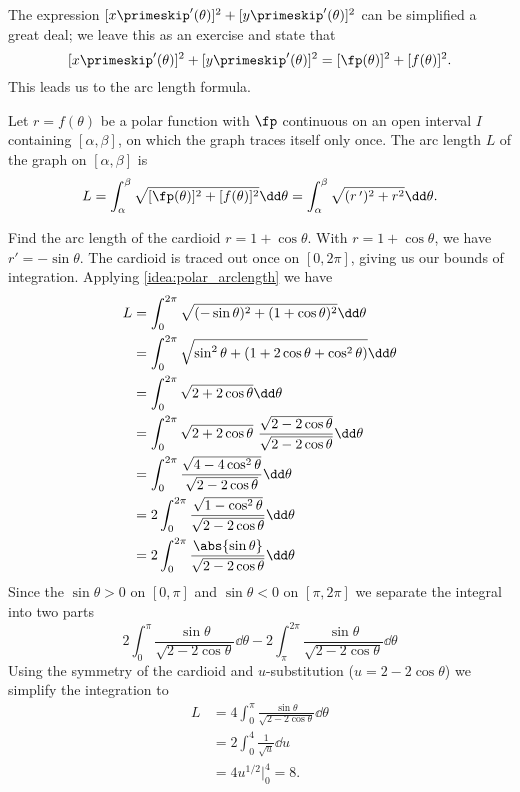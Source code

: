 The expression $[x\primeskip'(\theta)]^2+[y\primeskip'(\theta)]^2$ can be simplified a great deal; we leave this as an exercise and state that
\[
[x\primeskip'(\theta)]^2+[y\primeskip'(\theta)]^2 = [\fp(\theta)]^2+[f(\theta)]^2.
\]
This leads us to the  arc length formula.

\begin{keyidea}\label{idea:polar_arclength}%
Let  $r=f(\theta)$ be a polar function with $\fp$ continuous on an open interval $I$ containing $[\alpha,\beta]$, on which the graph traces itself only once. The arc length $L$ of the graph on $[\alpha,\beta]$ is
\[L = \int_\alpha^\beta \sqrt{[\fp(\theta)]^2+[f(\theta)]^2}\dd\theta = \int_\alpha^\beta\sqrt{(r\,')^2+ r^2}\dd\theta.\]
\end{keyidea}

\begin{example}\label{ex_cardioid_length}%
Find the arc length of the cardioid $r=1+\cos \theta$.
\solution
With $r=1+\cos \theta$, we have $r' = -\sin \theta$. The cardioid is traced out once on $[0,2\pi]$, giving us our bounds of integration. Applying \autoref{idea:polar_arclength} we have
\begin{align*}
	L
	& = \int_0^{2\pi} \sqrt{(-\sin \theta)^2  + (1 + \cos \theta)^2}\dd\theta \\
	& = \int_0^{2\pi} \sqrt{\sin^2 \theta + (1 + 2\cos \theta + \cos^2 \theta)}\dd\theta\\
	& = \int_0^{2\pi} \sqrt{2 + 2\cos \theta}\dd\theta\\
	& = \int_0^{2\pi} \sqrt{2 + 2\cos \theta}\ \frac{\sqrt {2-2\cos \theta}}{\sqrt {2-2\cos \theta}}\dd\theta\\
	& = \int_0^{2\pi} \frac{\sqrt{4 - 4\cos^2 \theta}}{\sqrt {2-2\cos \theta}}\dd\theta\\
	& = 2\int_0^{2\pi} \frac{\sqrt{1 - \cos^2 \theta}}{\sqrt {2-2\cos \theta}}\dd\theta\\
	& = 2\int_0^{2\pi} \frac{\abs{\sin\theta}}{\sqrt {2-2\cos \theta}}\dd\theta
\end{align*}
Since the $\sin \theta > 0$ on $[0, \pi]$ and $\sin \theta < 0$ on $[\pi, 2\pi]$ we separate the integral into two parts
\[
2\int_0^{\pi} \frac{\sin \theta}{\sqrt {2-2\cos \theta}}\dd\theta - 2\int_{\pi}^{2\pi} \frac{\sin \theta}{\sqrt {2-2\cos \theta}}\dd\theta
\]
Using the symmetry of the cardioid and $u$-substitution ($u = 2 - 2\cos \theta$) we simplify the integration to
\begin{align*}
L
& = 4\int_0^{\pi} \frac{\sin \theta}{\sqrt {2-2\cos \theta}}\dd\theta\\
& = 2\int_0^4 \frac{1}{\sqrt u}\dd u\\
& = 4  u^{1/2}\biggr|_0^4 = 8.
\end{align*}
\end{example}

